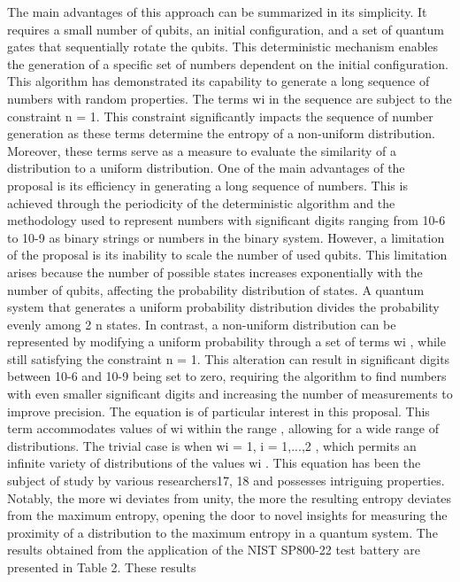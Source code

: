 \documentclass[12pt]{article}
\begin{document}
	   		{The main advantages of this approach can be summarized in its simplicity. It requires a small number of qubits, an
	   			initial configuration, and a set of quantum gates that sequentially rotate the qubits. This deterministic mechanism enables the
	   			generation of a specific set of numbers dependent on the initial configuration.
	   			This algorithm has demonstrated its capability to generate a long sequence of numbers with random properties. The terms
	   			wi
	   			in the sequence are subject to the constraint
	   			n = 1. This constraint significantly impacts the sequence of number
	   			generation as these terms determine the entropy of a non-uniform distribution. Moreover, these terms serve as a measure to
	   			evaluate the similarity of a distribution to a uniform distribution.
	   			One of the main advantages of the proposal is its efficiency in generating a long sequence of numbers. This is achieved
	   			through the periodicity of the deterministic algorithm and the methodology used to represent numbers with significant digits
	   			ranging from 10-6
	   			to 10-9
	   			as binary strings or numbers in the binary system. However, a limitation of the proposal is its
	   			inability to scale the number of used qubits. This limitation arises because the number of possible states increases exponentially
	   			with the number of qubits, affecting the probability distribution of states.
	   			A quantum system that generates a uniform probability distribution divides the probability evenly among 2
	   			n
	   			states. In
	   			contrast, a non-uniform distribution can be represented by modifying a uniform probability through a set of terms wi
	   			, while still
	   			satisfying the constraint 
	   			n = 1. This alteration can result in significant digits between 10-6
	   			and 10-9 being set to zero,
	   			requiring the algorithm to find numbers with even smaller significant digits and increasing the number of measurements to
	   			improve precision.
	   			The equation is of particular interest in this proposal. This term accommodates values of wi within the range
	   			, allowing for a wide range of distributions. The trivial case is when wi = 1, i = 1,...,2
	   			, which permits an infinite
	   			variety of distributions of the values wi
	   			. This equation has been the subject of study by various researchers17, 18 and possesses
	   			intriguing properties. Notably, the more wi deviates from unity, the more the resulting entropy deviates from the maximum
	   			entropy, opening the door to novel insights for measuring the proximity of a distribution to the maximum entropy in a quantum
	   			system.
	   			The results obtained from the application of the NIST SP800-22 test battery are presented in Table 2. These results}
\end{document}
